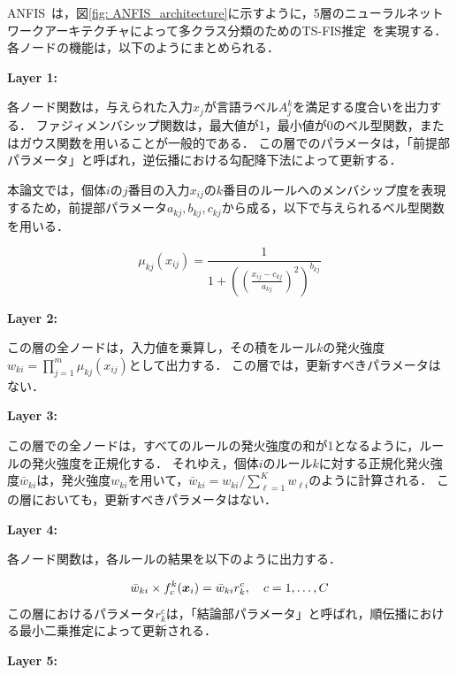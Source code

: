 \documentclass{ujarticle}
\begin{document}
ANFIS~\cite{Jang1993}は，図\ref{fig: ANFIS_architecture}に示すように，5層のニューラルネットワークアーキテクチャによって多クラス分類のためのTS-FIS推定~\cite{Angelov2004}を実現する．
各ノードの機能は，以下のようにまとめられる．

\vspace{3mm}
\noindent
\textbf{Layer 1:}

各ノード関数は，与えられた入力$x_j$が言語ラベル$A_j^k$を満足する度合いを出力する．
ファジィメンバシップ関数は，最大値が1，最小値が0のベル型関数，またはガウス関数を用いることが一般的である．
この層でのパラメータは，「前提部パラメータ」と呼ばれ，逆伝播における勾配降下法によって更新する．

本論文では，個体$i$の$j$番目の入力$x_{ij}$の$k$番目のルールへのメンバシップ度を表現するため，前提部パラメータ$a_{kj}, b_{kj}, c_{kj}$から成る，以下で与えられるベル型関数を用いる．

\begin{equation}
	\mu_{kj} (x_{ij}) = \frac{1}{1+\left( \left(\frac{x_{ij}-c_{kj}}{a_{kj}} \right)^2 \right)^{b_{kj}}}
\end{equation}

\vspace{3mm}
\noindent
\textbf{Layer 2:}

この層の全ノードは，入力値を乗算し，その積をルール$k$の発火強度$w_{ki} = \prod_{j=1}^m \mu_{kj} (x_{ij})$として出力する．
この層では，更新すべきパラメータはない．

\vspace{3mm}
\noindent
\textbf{Layer 3:}

この層での全ノードは，すべてのルールの発火強度の和が1となるように，ルールの発火強度を正規化する．
それゆえ，個体$i$のルール$k$に対する正規化発火強度$\bar{w}_{ki}$は，発火強度$w_{ki}$を用いて，$\bar{w}_{ki} = w_{ki} / \sum_{\ell=1}^K w_{\ell i}$のように計算される．
この層においても，更新すべきパラメータはない．

\vspace{3mm}
\noindent
\textbf{Layer 4:}

各ノード関数は，各ルールの結果を以下のように出力する．

\begin{equation}
	\bar{w}_{ki} \times f_{c}^k (\mbox{\boldmath $x$}_{i}) = \bar{w}_{ki} r_{k}^c, \quad c=1, \dots, C
\end{equation}
この層におけるパラメータ$r_{k}^c$は，「結論部パラメータ」と呼ばれ，順伝播における最小二乗推定によって更新される．

\vspace{3mm}
\noindent
\textbf{Layer 5:}
\end{document}
